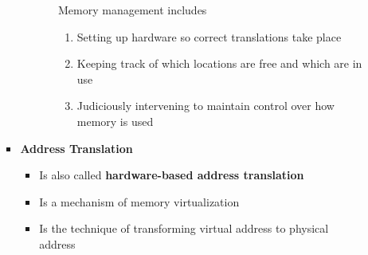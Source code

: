 \documentclass[12pt]{article}
\begin{document}
\begin{enumerate}[1.]
\begin{enumerate}[a)]
\begin{itemize}
\begin{itemize}
\begin{enumerate}[1.]
                    \bigskip

                    Memory management includes

                    \bigskip

                    \begin{enumerate}[1.]
                        \item Setting up hardware so correct translations take place
                        \item Keeping track of which locations are free and which are in use
                        \item Judiciously intervening to maintain control over how memory is used
                    \end{enumerate}

                    \bigskip
                \end{enumerate}
            \end{itemize}

            \item \textbf{Address Translation}

            \begin{itemize}
                \item Is also called \textbf{hardware-based address translation}
                \item Is a mechanism of memory virtualization
                \item Is the technique of transforming virtual address to physical address
            \end{itemize}





\end{itemize}
\end{enumerate}
\end{enumerate}
\end{document}
